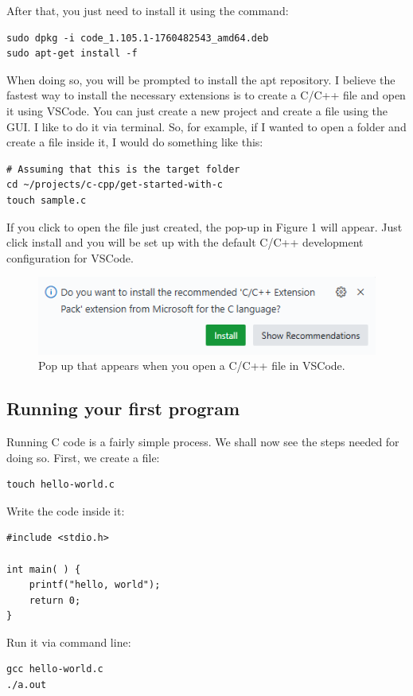 \documentclass{article}
\begin{document}
After that, you just need to install it using the command:

\begin{verbatim}
sudo dpkg -i code_1.105.1-1760482543_amd64.deb
sudo apt-get install -f
\end{verbatim}

When doing so, you will be prompted to install the apt repository. I believe the fastest way to install the necessary extensions is to create a C/C++ file and open it using VSCode. You can just create a new project and create a file using the GUI. I like to do it via terminal. So, for example, if I wanted to open a folder and create a file inside it, I would do something like this:
\begin{verbatim}
# Assuming that this is the target folder
cd ~/projects/c-cpp/get-started-with-c
touch sample.c
\end{verbatim}

If you click to open the file just created, the pop-up in Figure 1 will appear. Just click install and you will be set up with the default C/C++ development configuration for VSCode.
\begin{figure}
\centering
\includegraphics[width=0.25\linewidth]{./images/c-cpp-extension-popup.png}
\caption{\label{fig:extension-popup}Pop up that appears when you open a C/C++ file in VSCode.}
\end{figure}


\subsection{Running your first program}
Running C code is a fairly simple process. We shall now see the steps needed for doing so. First, we create a file:
\begin{verbatim}
touch hello-world.c
\end{verbatim}

Write the code inside it:
\begin{verbatim}
#include <stdio.h>

int main( ) {
    printf("hello, world");
    return 0;
}
\end{verbatim}

Run it via command line:
\begin{verbatim}
gcc hello-world.c 
./a.out 
\end{verbatim}
\end{document}
